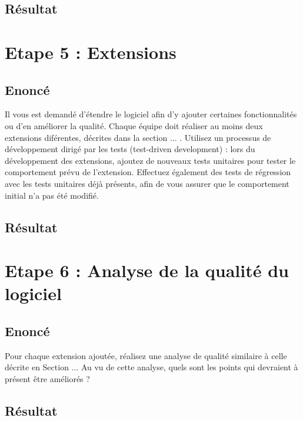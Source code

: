 \documentclass[12pt,a4paper,final]{article}
\begin{document}
\subsection{Résultat}



\section{Etape 5 : Extensions}\label{sec:etape5}
\subsection{Enoncé} 
Il vous est demandé d'étendre le logiciel afin d'y ajouter certaines fonctionnalités ou d'en améliorer la qualité. Chaque équipe doit réaliser au moins deux extensions diférentes, décrites dans la section ... .
Utilisez un processus de développement dirigé par les tests (test-driven development) : lors du développement des extensions, ajoutez de nouveaux tests unitaires pour tester le comportement prévu de l'extension. Effectuez également des tests de régression avec les tests unitaires déjà présents, afin de vous assurer que le comportement initial n'a pas été modifié.
\subsection{Résultat}



\section{Etape 6 : Analyse de la qualité du logiciel}\label{sec:etape6}
\subsection{Enoncé} 
Pour chaque extension ajoutée, réalisez une analyse de qualité similaire à celle décrite en Section ... Au vu de cette analyse, quels sont les points qui devraient à présent être améliorés ?
\subsection{Résultat}



\end{document}
